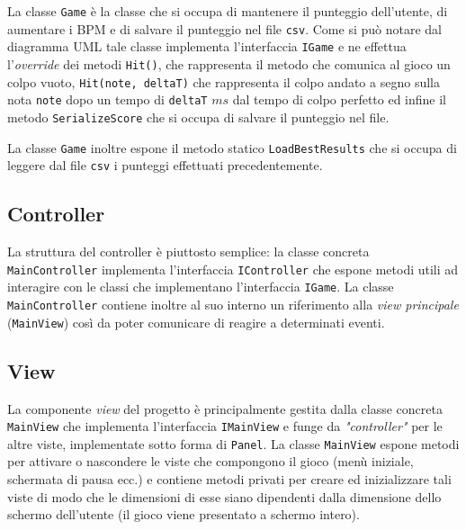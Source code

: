 \vspace{1cm}
\begin{figure}[h]
\end{figure}
La classe \texttt{Game} è la classe che si occupa di mantenere il punteggio dell'utente, di aumentare i BPM e di salvare il punteggio nel file \texttt{csv}.
Come si può notare dal diagramma UML tale classe implementa l'interfaccia \texttt{IGame} e ne effettua l'\emph{override} dei metodi \texttt{Hit()}, che rappresenta il metodo che comunica al gioco un colpo vuoto, \texttt{Hit(note, deltaT)} che rappresenta il colpo andato a segno sulla nota \texttt{note} dopo un tempo di \texttt{deltaT} $ms$ dal tempo di colpo perfetto ed infine il metodo \texttt{SerializeScore} che si occupa di salvare il punteggio nel file.

La classe \texttt{Game} inoltre espone il metodo statico \texttt{LoadBestResults} che si occupa di leggere dal file \texttt{csv} i punteggi effettuati precedentemente.

\newpage
\subsection{Controller}
\begin{figure}[h]
\end{figure}
La struttura del controller è piuttosto semplice: la classe concreta \texttt{MainController} implementa l'interfaccia \texttt{IController} che espone metodi utili ad interagire con le classi che implementano l'interfaccia \texttt{IGame}.
La classe \texttt{MainController} contiene inoltre al suo interno un riferimento alla \emph{view principale} (\texttt{MainView}) così da poter comunicare di reagire a determinati eventi.

\newpage
\subsection{View}
\begin{figure}[h!]
\end{figure}
La componente \emph{view} del progetto è principalmente gestita dalla classe concreta \texttt{MainView} che implementa l'interfaccia \texttt{IMainView} e funge da \emph{"controller"} per le altre viste, implementate sotto forma di \texttt{Panel}.
La classe \texttt{MainView} espone metodi per attivare o nascondere le viste che compongono il gioco (menù iniziale, schermata di pausa ecc.) e contiene metodi privati per creare ed inizializzare tali viste di modo che le dimensioni di esse siano dipendenti dalla dimensione dello schermo dell'utente (il gioco viene presentato a schermo intero).

